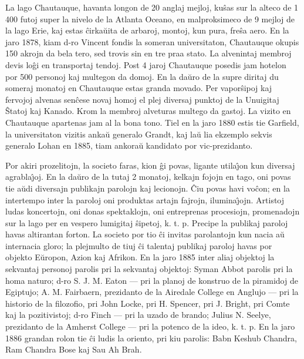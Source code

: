    La lago Chautauque, havanta longon de 20 anglaj mejloj, ku\^sas sur
la alteco de 1 400 futoj super la nivelo de la Atlanta Oceano, en
malproksimeco de 9 mejloj de la lago Erie, kaj estas \^cirka\u uita
de arbaroj, montoj, kun pura, fre\^sa aero. En la jaro 1878, kiam
d-ro Vincent fondis la someran universitaton, Chautauque okupis 150
akrojn da bela tero, sed trovis sin en tre praa stato. La alvenintaj
membroj devis lo\^gi en transportaj tendoj. Post 4 jaroj Chautauque
posedis jam hotelon por 500 personoj kaj multegon da domoj. En la
da\u uro de la supre diritaj du someraj monatoj en Chautauque estas
granda movado. Per vapor\^sipoj kaj fervojoj alvenas sen\^cese novaj
homoj el plej diversaj punktoj de la Unuigitaj \^Statoj kaj Kanado.
Krom la membroj alveturas multego da gastoj. La vizito en Chautauque
apartenas jam al la bona tono. Tiel en la jaro 1880 estis tie
Garfield, la universitaton vizitis anka\u u generalo Grandt, kaj
la\u u lia ekzemplo sekvis generalo Lohan en 1885, tiam ankora\u u
kandidato por vic-prezidanto.

   Por akiri prozelitojn, la societo faras, kion \^gi povas, ligante
utila\^{\j}on kun diversaj agrabla\^{\j}oj. En la da\u uro de la
tutaj 2 monatoj, kelkajn fojojn en tago, oni povas tie a\u udi
diversajn publikajn parolojn kaj lecionojn. \^Ciu povas havi
vo\^con; en la intertempo inter la paroloj oni produktas artajn
fajrojn, ilumina\^{\j}ojn. Artistoj ludas koncertojn, oni donas
spektaklojn, oni entreprenas procesiojn, promenadojn sur la lago per
en vespero lumigitaj \^sipetoj, k. t. p. Precipe la publikaj paroloj
havas altirantan forton. La societo por tio \^ci invitas parolantojn
kun nacia a\u u internacia gloro; la plejmulto de tiuj \^ci talentaj
publikaj paroloj havas por objekto E\u uropon, Azion kaj Afrikon. En
la jaro 1885 inter aliaj objektoj la sekvantaj personoj parolis pri
la sekvantaj objektoj: Syman Abbot parolis pri la homa naturo; d-ro
S. J. M. Eaton --- pri la planoj de konstruo de la piramidoj de
Egiptujo; A. M. Fairbaern, prezidanto de la Airedale College en
Anglujo --- pri la historio de la filozofio, pri John Locke, pri H.
Spencer, pri J. Bright, pri Comte kaj la pozitivistoj; d-ro Finch
--- pri la uzado de brando; Julius N. Seelye, prezidanto de la
Amherst College --- pri la potenco de la ideo, k. t. p. En la jaro
1886 grandan rolon tie \^ci ludis la oriento, pri kiu parolis: Babn
Keshub Chandra, Ram Chandra Bose kaj Sau Ah Brah.

